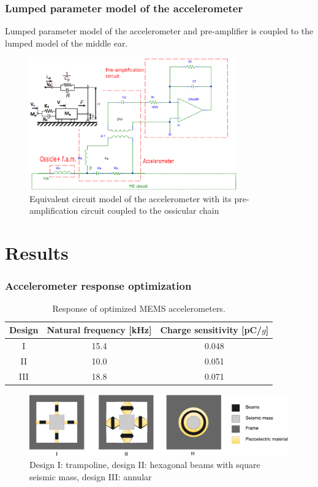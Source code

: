 \documentclass[dvipsnames,12pt]{beamer}
\begin{document}
\begin{frame}
\frametitle{Lumped parameter model of the accelerometer}
\vskip-0.5cm
    Lumped parameter model of the accelerometer and pre-amplifier is coupled to the lumped model of the middle ear.
    \vskip-0.2cm

\begin{figure}[!ht]
\centering
\includegraphics [width=0.8\textwidth]{Figures/Figure3.eps}
\caption{Equivalent circuit model of the accelerometer with its pre-amplification circuit coupled to the ossicular chain}
\label{fig:CE_OM2}
\end{figure}
\end{frame}

\section{Results}
\begin{frame}
\frametitle{Accelerometer response optimization}
    \begin{table}[ht!]
 \caption{Response of optimized MEMS accelerometers.}
    \label{tab:optimized_accelerometer}
    \centering
   \begin{tabularx}{\linewidth}{cCc}
   \hline 
   Design & Natural frequency [kHz] & Charge sensitivity [pC/$g$] \\\hline \hline
         I &  15.4 & 0.048  \\
         II &  10.0 & 0.051  \\
         III & 18.8 & 0.071  \\
          \hline
    \end{tabularx}
\end{table}
  \begin{figure}[ht!]
  \centering
\includegraphics [width=\textwidth]{Figures/Figure1.pdf}
\caption{Design I: trampoline, design II: hexagonal beams with square seismic mass, design III: annular}
\label{fig:types_of_accelerometers}
\end{figure}
\end{frame}
\end{document}
